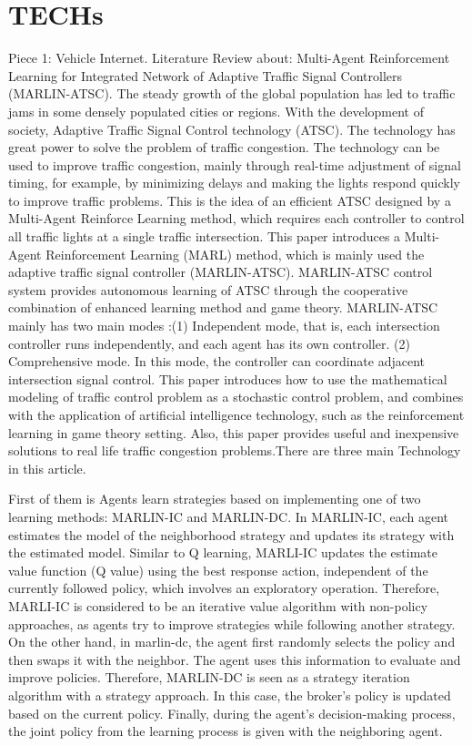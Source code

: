 \documentclass[letterpaper,10pt,draftclsnofoot,onecolumn]{IEEEtran}
\begin{document}
\section{TECHs}

 Piece 1: Vehicle Internet. Literature Review about: Multi-Agent Reinforcement Learning for Integrated Network of Adaptive Traffic Signal Controllers (MARLIN-ATSC). The steady growth of the global population has led to traffic jams in some densely populated cities or regions. With the development of society, Adaptive Traffic Signal Control technology (ATSC). The technology has great power to solve the problem of traffic congestion. The technology can be used to improve traffic congestion, mainly through real-time adjustment of signal timing, for example, by minimizing delays and making the lights respond quickly to improve traffic problems. This is the idea of an efficient ATSC designed by a Multi-Agent Reinforce Learning method, which requires each controller to control all traffic lights at a single traffic intersection. This paper introduces a Multi-Agent Reinforcement Learning (MARL) method, which is mainly used the adaptive traffic signal controller (MARLIN-ATSC). MARLIN-ATSC control system provides autonomous learning of ATSC through the cooperative combination of enhanced learning method and game theory. MARLIN-ATSC mainly has two main modes :(1) Independent mode, that is, each intersection controller runs independently, and each agent has its own controller. (2) Comprehensive mode. In this mode, the controller can coordinate adjacent intersection signal control. This paper introduces how to use the mathematical modeling of traffic control problem as a stochastic control problem, and combines with the application of artificial intelligence technology, such as the reinforcement learning in game theory setting. Also, this paper provides useful and inexpensive solutions to real life traffic congestion problems.There are three main Technology in this article. 

First of them is Agents learn strategies based on implementing one of two learning methods: MARLIN-IC and MARLIN-DC. In MARLIN-IC, each agent estimates the model of the neighborhood strategy and updates its strategy with the estimated model. Similar to Q learning, MARLI-IC updates the estimate value function (Q value) using the best response action, independent of the currently followed policy, which involves an exploratory operation. Therefore, MARLI-IC is considered to be an iterative value algorithm with non-policy approaches, as agents try to improve strategies while following another strategy. On the other hand, in marlin-dc, the agent first randomly selects the policy and then swaps it with the neighbor. The agent uses this information to evaluate and improve policies. Therefore, MARLIN-DC is seen as a strategy iteration algorithm with a strategy approach. In this case, the broker's policy is updated based on the current policy. Finally, during the agent's decision-making process, the joint policy from the learning process is given with the neighboring agent.
        	    
\end{document}
